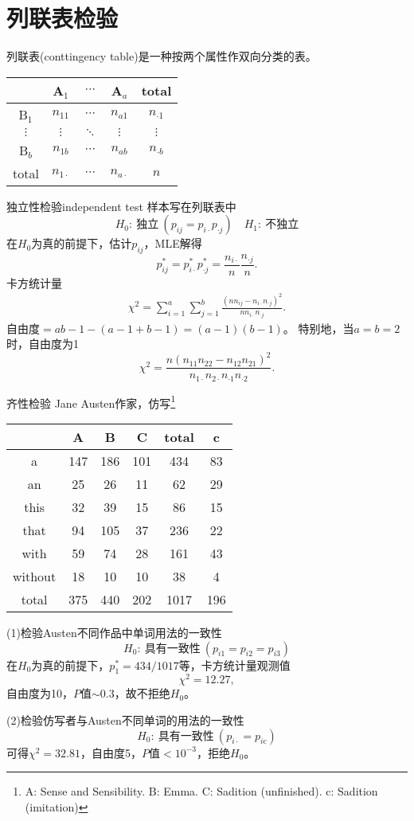 \section{列联表检验}
列联表(conttingency table)是一种按两个属性作双向分类的表。
\begin{center}
	\begin{tabular}{c|ccc|c}
		\toprule
		&A$_1$&$\cdots$&A$_a$&total\\
		\hline
		B$_1$&$n_{11}$&$\cdots$&$n_{a1}$&$n_{\cdot 1}$\\
		$\vdots$&$\vdots$&$\ddots$&$\vdots$&$\vdots$\\
		B$_b$&$n_{1b}$&$\cdots$&$n_{ab}$&$n_{\cdot b}$\\
		\hline
		total&$n_{1\cdot}$&$\cdots$&$n_{a\cdot}$&$n$\\
		\bottomrule
	\end{tabular}
\end{center}
\begin{example}{独立性检验}{independent test}
	样本写在列联表中
	\[
		H_0:~\text{独立}~(p_{ij}=p_{i\cdot}p_{\cdot j})\quad H_1:~\text{不独立}
	\]
	在$H_0$为真的前提下，估计$p_{ij}$，MLE解得
	\[
		p_{ij}^\ast=p_{i\cdot}^\ast p_{\cdot j}^\ast=\frac{n_{i\cdot}}n\frac{n_{\cdot j}}n.
	\]
	卡方统计量
	\begin{align}
		\chi^2=\sum_{i=1}^a\sum_{j=1}^b\frac{(nn_{ij}-n_{i\cdot}n_{\cdot j})^2}{nn_{i\cdot}n_{\cdot j}}.
	\end{align}
	自由度$=ab-1-(a-1+b-1)=(a-1)(b-1)$。
	\tcblower
	特别地，当$a=b=2$时，自由度为1
	\[
		\chi^2=\frac{n(n_{11}n_{22}-n_{12}n_{21})^2}{n_{1\cdot}n_{2\cdot}n_{\cdot 1}n_{\cdot 2}}.
	\]
\end{example}
\begin{example}{齐性检验}{}
	Jane Austen作家，仿写\footnote{A: Sense and Sensibility. B: Emma. C: Sadition (unfinished). c: Sadition (imitation)}
	\begin{center}
		\begin{tabular}{c|ccc|c|c}
			\toprule
			&A&B&C&total&c\\
			\hline
			a&147&186&101&434&83\\
			an&25&26&11&62&29\\
			this&32&39&15&86&15\\
			that&94&105&37&236&22\\
			with&59&74&28&161&43\\
			without&18&10&10&38&4\\
			\hline
			total&375&440&202&1017&196\\
			\bottomrule
		\end{tabular}
	\end{center}
	(1)检验Austen不同作品中单词用法的一致性
	\[
		H_0:~\text{具有一致性}~(p_{i1}=p_{i2}=p_{i3})
	\]
	在$H_0$为真的前提下，$p_1^\ast=434/1017$等，卡方统计量观测值
	\[
		\chi^2=12.27,
	\]
	自由度为10，$P$值$\sim 0.3$，故不拒绝$H_0$。

	(2)检验仿写者与Austen不同单词的用法的一致性
	\[
		H_0:~\text{具有一致性}~(p_{i\cdot}=p_{i\mathrm c})
	\]
	可得$\chi^2=32.81$，自由度5，$P$值$<10^{-3}$，拒绝$H_0$。
\end{example}
